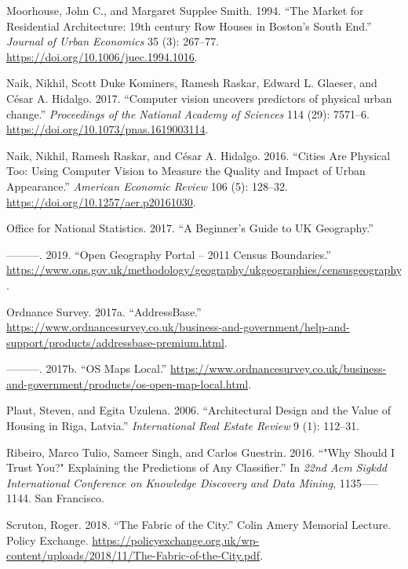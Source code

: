 \documentclass[]{article}
\begin{document}
\leavevmode\hypertarget{ref-Moorhouse1994}{}%
Moorhouse, John C., and Margaret Supplee Smith. 1994. ``The Market for
Residential Architecture: 19th century Row Houses in Boston's South
End.'' \emph{Journal of Urban Economics} 35 (3): 267--77.
\url{https://doi.org/10.1006/juec.1994.1016}.

\leavevmode\hypertarget{ref-Naik2017}{}%
Naik, Nikhil, Scott Duke Kominers, Ramesh Raskar, Edward L. Glaeser, and
César A. Hidalgo. 2017. ``Computer vision uncovers predictors of
physical urban change.'' \emph{Proceedings of the National Academy of
Sciences} 114 (29): 7571--6.
\url{https://doi.org/10.1073/pnas.1619003114}.

\leavevmode\hypertarget{ref-Naik2016AER}{}%
Naik, Nikhil, Ramesh Raskar, and César A. Hidalgo. 2016. ``Cities Are
Physical Too: Using Computer Vision to Measure the Quality and Impact of
Urban Appearance.'' \emph{American Economic Review} 106 (5): 128--32.
\url{https://doi.org/10.1257/aer.p20161030}.

\leavevmode\hypertarget{ref-ONS2017b}{}%
Office for National Statistics. 2017. ``A Beginner's Guide to UK
Geography.''

\leavevmode\hypertarget{ref-ONS2017}{}%
---------. 2019. ``Open Geography Portal -- 2011 Census Boundaries.''
\url{https://www.ons.gov.uk/methodology/geography/ukgeographies/censusgeography}.

\leavevmode\hypertarget{ref-OrdnanceSurvey2017}{}%
Ordnance Survey. 2017a. ``AddressBase.''
\url{https://www.ordnancesurvey.co.uk/business-and-government/help-and-support/products/addressbase-premium.html}.

\leavevmode\hypertarget{ref-OrdnanceSurvey2017a}{}%
---------. 2017b. ``OS Maps Local.''
\url{https://www.ordnancesurvey.co.uk/business-and-government/products/os-open-map-local.html}.

\leavevmode\hypertarget{ref-Plaut2006}{}%
Plaut, Steven, and Egita Uzulena. 2006. ``Architectural Design and the
Value of Housing in Riga, Latvia.'' \emph{International Real Estate
Review} 9 (1): 112--31.

\leavevmode\hypertarget{ref-Ribeiro2016}{}%
Ribeiro, Marco Tulio, Sameer Singh, and Carlos Guestrin. 2016. ``"Why
Should I Trust You?" Explaining the Predictions of Any Classifier.'' In
\emph{22nd Acm Sigkdd International Conference on Knowledge Discovery
and Data Mining}, 1135-----1144. San Francisco.

\leavevmode\hypertarget{ref-scruton2018}{}%
Scruton, Roger. 2018. ``The Fabric of the City.'' Colin Amery Memorial
Lecture. Policy Exchange.
\url{https://policyexchange.org.uk/wp-content/uploads/2018/11/The-Fabric-of-the-City.pdf}.
\end{document}

